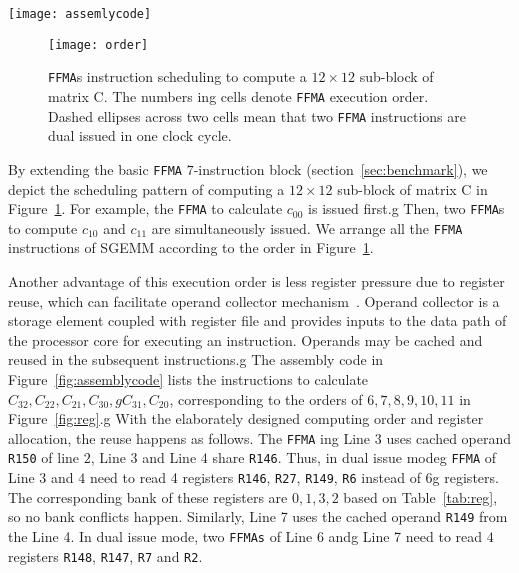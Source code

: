 \begin{figure*}[htbp]
\begin{center}
\texttt{[image: assemlycode]}
    \caption{The comparison of compiler generated codes and our tuned assembly codes.}
\label{fig:assemblycode}
\end{center}
\end{figure*}

\begin{figure}[htbp]
\begin{center}
\texttt{[image: order]}
\caption{{\tt FFMA}s instruction scheduling to compute a $12\times 12$ sub-block of matrix C.  The numbers ing
cells denote {\tt FFMA} execution order. Dashed ellipses across two cells mean that two {\tt FFMA} instructions are dual issued in one clock cycle.}
\label{fig:order}
\end{center}
\end{figure}

By extending the basic {\tt FFMA} $7$-instruction block (section~\ref{sec:benchmark}), we depict the scheduling pattern of computing a $12\times 12$ sub-block of matrix C in Figure~\ref{fig:order}.
For example, the {\tt FFMA} to calculate $c_{00}$ is issued first.g
Then, two {\tt FFMA}s to
compute $c_{10}$ and $c_{11}$ are simultaneously issued. We arrange all the {\tt FFMA} instructions of SGEMM according to the order in Figure~\ref{fig:order}.

Another advantage of this execution order is less register pressure due to register reuse, which can facilitate
operand collector mechanism~\cite{collector}. Operand collector is a storage element coupled with register file and
provides inputs to the data path of the processor core for executing an instruction.  Operands may be cached and reused
in the subsequent instructions.g
The assembly code in Figure~\ref{fig:assemblycode} lists the instructions to calculate $C_{32},C_{22}, C_{21}, C_{30},g
C_{31}, C_{20}$, corresponding to the orders of $6,7,8,9,10,11$ in Figure~\ref{fig:reg}.g
With the elaborately designed computing order and register allocation, the reuse happens as follows. The {\tt FFMA} ing
Line $3$ uses cached operand {\tt R150} of line $2$, Line $3$ and Line $4$ share {\tt R146}. Thus, in dual issue modeg
{\tt FFMA} of Line $3$ and $4$ need to read 4 registers {\tt R146}, {\tt R27}, {\tt R149}, {\tt R6} instead of $6$g
registers. The corresponding bank of these registers are $0,1,3,2$ based on Table~\ref{tab:reg}, so no bank conflicts happen.
Similarly, Line 7 uses the cached operand {\tt R149} from the Line 4. In dual issue mode, two {\tt FFMAs} of Line 6 andg
Line 7 need to read $4$ registers {\tt R148}, {\tt R147}, {\tt R7} and {\tt R2}.

